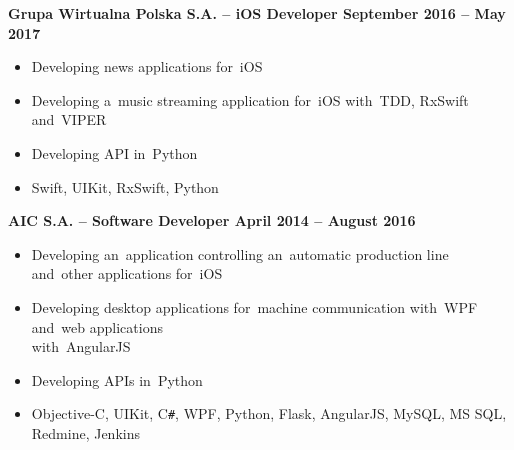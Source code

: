 \documentclass[11pt,a4paper]{article}
\begin{document}
    \vspace{-.17cm}

    {\bf Grupa Wirtualna Polska S.A. -- iOS Developer \hfill September 2016 -- May 2017}

    \vspace{-.23cm}
    \begin{itemize}[leftmargin=1.5cm] \itemsep.2mm \parskip0mm 
        \item Developing news applications for~iOS
        \item Developing a~music streaming application for~iOS with~TDD, RxSwift and~VIPER
        \item Developing API in~Python

        \vspace{0.1cm}
        \setlength\itemindent{-1em}
        \item[] {\small{\color{CadetBlue}{\bf Tech stack:}}
            Swift,
            UIKit,
            RxSwift,
            Python
        }
    \end{itemize}

    \vspace{-.17cm}

    {\bf AIC S.A. -- Software Developer \hfill April 2014 -- August 2016}

    \vspace{-.23cm}
    \begin{itemize}[leftmargin=1.5cm] \itemsep.2mm \parskip0mm 
        \item Developing an~application controlling an~automatic production line and~other applications for~iOS
        \item Developing desktop applications for~machine communication with~WPF and~web applications \\
            with~AngularJS
        \item Developing APIs in~Python

        \vspace{0.1cm}
        \setlength\itemindent{-1em}
        \item[] {\small{\color{CadetBlue}{\bf Tech stack:}}
            Objective-C,
            UIKit,
            C\texttt{\#},
            WPF,
            Python,
            Flask,
            AngularJS,
            MySQL,
            MS SQL,
            Redmine,
            Jenkins
        }
    \end{itemize}

\end{document}
